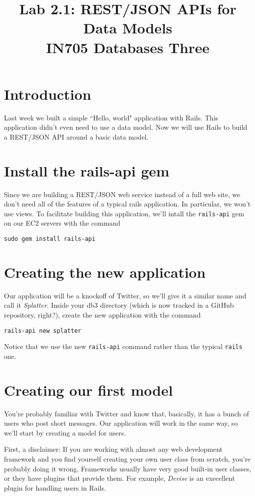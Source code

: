 \documentclass{article}
\begin{document}
\title{Lab 2.1: REST/JSON APIs for Data Models\\ IN705 Databases Three}
\date{}
\maketitle

\section*{Introduction}
Last week we built a simple ``Hello, world" application with Rails. This application didn't even need to use a data model.  Now we will use Rails to build a REST/JSON API around a basic data model.

\section{Install the rails-api gem}
Since we are building a REST/JSON web service instead of a full web site, we don't need all of the features of a typical rails application.  In particular, we won't use views.  To facilitate building this application, we'll intall the \texttt{rails-api} gem on our EC2 servers with the command

\texttt{sudo gem install rails-api}

\section{Creating the new application}
Our application will be a knockoff of Twitter, so we'll give it a similar name and call it \emph{Splatter}.  Inside your db3 directory (which is now tracked in a GitHub repository, right?), create the new application with the command

\texttt{rails-api new splatter}

Notice that we use the new \texttt{rails-api} command rather than the typical \texttt{rails} one.

\section{Creating our first model}
You're probably familiar with Twitter and know that, basically, it has a bunch of users who post short messages.  Our application will work in the same way, so we'll start by creating a model for users.

First, a disclaimer:  If you are working with almost any web development framework and you find yourself creating your own user class from scratch, you're probably doing it wrong.  Frameworks usually have very good built-in user classes, or they have plugins that provide them.  For example, \emph{Devise} is an execellent plugin for handling users in Rails.  
\end{document}
